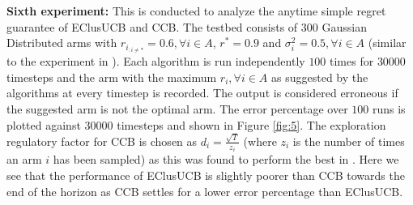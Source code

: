 	
\textbf{Sixth experiment:} This is conducted to analyze the anytime simple regret guarantee of EClusUCB and CCB. The testbed consists of $300$ Gaussian Distributed arms with $r_{i_{:{{i}\neq {*}}}}=0.6,\forall i\in A$, $r^{*}=0.9$ and $\sigma_{i}^{2}=0.5,\forall i\in A$ (similar to the experiment in \citet{liu2016modification}). Each algorithm is run independently $100$ times for $30000$ timesteps and the arm with the maximum $\hat{r}_i,\forall i\in A$ as suggested by the algorithms at every timestep is recorded. The output is considered erroneous if the suggested arm is not the optimal arm. The error percentage over $100$ runs is plotted against $30000$ timesteps and shown in Figure \ref{fig:5}. The exploration regulatory factor for CCB is chosen as $d_i=\frac{\sqrt{T}}{z_{i}}$ (where $z_{i}$ is the number of times an arm ${i}$ has been sampled) as this was found to perform the best in \citet{liu2016modification}. Here we see that the performance of EClusUCB is slightly poorer than CCB towards the end of the horizon as CCB settles for a lower error percentage than EClusUCB.

